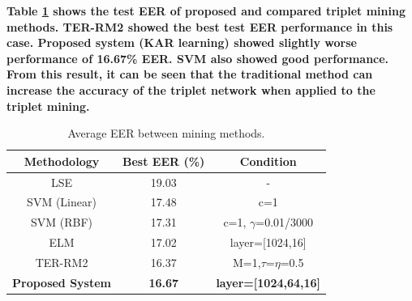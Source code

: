 \textbf{
Table \ref{tab_mining} shows the test EER of proposed and compared triplet mining methods. 
TER-RM2 showed the best test EER performance in this case. Proposed system (KAR learning) showed slightly worse performance of 16.67\% EER. SVM also showed good performance.
From this result, it can be seen that the traditional method can increase the accuracy of the triplet network when applied to the triplet mining.
}

\begin{table}[!h]
    \caption{Average EER between mining methods.}\label{tab_mining}
    \centering
    \begin{tabular}{|c|c|c|}
    \hline
    Methodology   &   Best EER (\%) &   Condition   \\  \hline
    LSE &   19.03   &  - \\ 
    SVM (Linear) &   17.48   &   c=1 \\
    SVM (RBF)    &   17.31   &   c=1, $\gamma$=0.01/3000 \\
    ELM &   17.02   &   layer=[1024,16] \\
    TER-RM2 &   16.37   &  M=1,$\tau$=$\eta$=0.5   \\     \hline
    \textbf{Proposed System} &   \textbf{16.67}   &  \textbf{layer=[1024,64,16]}  \\
     \hline
    \end{tabular}
\end{table}